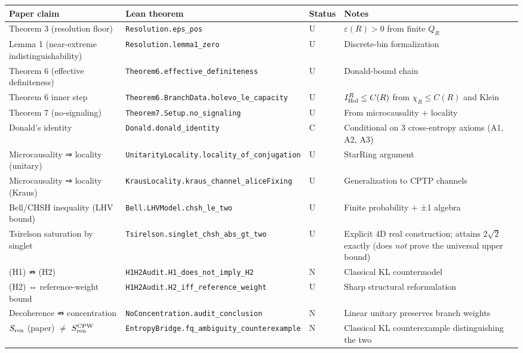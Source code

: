 \documentclass[11pt,a4paper]{article}
\begin{document}
\begin{center}
\small
\begin{tabularx}{\linewidth}{|Y|Y|Y|Y|}
\hline
\textbf{Paper claim} & \textbf{Lean theorem} & \textbf{Status} & \textbf{Notes} \\
\hline
Theorem 3 (resolution floor) & \texttt{Resolution.eps\_pos} & U & $\varepsilon(R) > 0$ from finite $Q_R$ \\
\hline
Lemma 1 (near-extreme indistinguishability) & \texttt{Resolution.lemma1\_zero} & U & Discrete-bin formalization \\
\hline
Theorem 6 (effective definiteness) & \texttt{Theorem6.effective\_definiteness} & U & Donald-bound chain \\
\hline
Theorem 6 inner step & \texttt{Theorem6.BranchData.holevo\_le\_capacity} & U & $I_{\rm Hol}^R \le C(R)$ from $\chi_R \le C(R)$ and Klein \\
\hline
Theorem 7 (no-signaling) & \texttt{Theorem7.Setup.no\_signaling} & U & From microcausality + locality \\
\hline
Donald's identity & \texttt{Donald.donald\_identity} & C & Conditional on 3 cross-entropy axioms (A1, A2, A3) \\
\hline
Microcausality ⇒ locality (unitary) & \texttt{UnitarityLocality.locality\_of\_conjugation} & U & StarRing argument \\
\hline
Microcausality ⇒ locality (Kraus) & \texttt{KrausLocality.kraus\_channel\_aliceFixing} & U & Generalization to CPTP channels \\
\hline
Bell/CHSH inequality (LHV bound) & \texttt{Bell.LHVModel.chsh\_le\_two} & U & Finite probability + ±1 algebra \\
\hline
Tsirelson saturation by singlet & \texttt{Tsirelson.singlet\_chsh\_abs\_gt\_two} & U & Explicit 4D real construction; attains $2\sqrt{2}$ exactly (does \emph{not} prove the universal upper bound) \\
\hline
(H1) ⇏ (H2) & \texttt{H1H2Audit.H1\_does\_not\_imply\_H2} & N & Classical KL countermodel \\
\hline
(H2) ⇔ reference-weight bound & \texttt{H1H2Audit.H2\_iff\_reference\_weight} & U & Sharp structural reformulation \\
\hline
Decoherence ⇏ concentration & \texttt{NoConcentration.audit\_conclusion} & N & Linear unitary preserves branch weights \\
\hline
$S_{\rm ren}$ (paper) $\neq$ $S_{\rm ren}^{\rm CPW}$ & \texttt{EntropyBridge.fq\_ambiguity\_counterexample} & N & Classical KL counterexample distinguishing the two \\

\end{tabularx}
\end{center}
\end{document}
